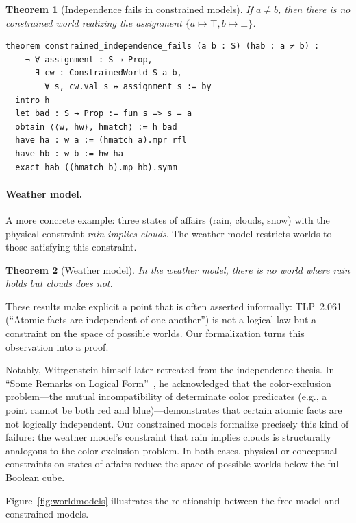 \documentclass[jsl,bibother]{asl}
\newtheorem{theorem}{Theorem}[section]
\theoremstyle{definition}
\theoremstyle{remark}
\begin{document}
\begin{theorem}[Independence fails in constrained models]
\label{thm:constrained}
If $a \neq b$, then there is no constrained world realizing the
assignment $\{a \mapsto \top, b \mapsto \bot\}$.
\end{theorem}

\begin{lstlisting}
theorem constrained_independence_fails (a b : S) (hab : a ≠ b) :
    ¬ ∀ assignment : S → Prop,
      ∃ cw : ConstrainedWorld S a b,
        ∀ s, cw.val s ↔ assignment s := by
  intro h
  let bad : S → Prop := fun s => s = a
  obtain ⟨⟨w, hw⟩, hmatch⟩ := h bad
  have ha : w a := (hmatch a).mpr rfl
  have hb : w b := hw ha
  exact hab ((hmatch b).mp hb).symm
\end{lstlisting}

\paragraph{Weather model.}
A more concrete example: three states of affairs (rain, clouds,
snow) with the physical constraint \emph{rain implies clouds}.
The weather model restricts worlds to those satisfying this
constraint.

\begin{theorem}[Weather model]
\label{thm:weather}
In the weather model, there is no world where rain holds but
clouds does not.
\end{theorem}

\noindent
These results make explicit a point that is often asserted
informally: TLP~2.061 (``Atomic facts are independent of one
another'') is not a logical law but a constraint on the space of
possible worlds.  Our formalization turns this observation into a
proof.

Notably, Wittgenstein himself later retreated from the
independence thesis.  In ``Some Remarks on Logical
Form''~\cite{wittgenstein1929}, he acknowledged that the
color-exclusion problem---the mutual incompatibility of
determinate color predicates (e.g., a point cannot be both red
and blue)---demonstrates that certain atomic facts are not
logically independent.  Our constrained models formalize
precisely this kind of failure: the weather model's constraint
that rain implies clouds is structurally analogous to the
color-exclusion problem.  In both cases, physical or conceptual
constraints on states of affairs reduce the space of possible
worlds below the full Boolean cube.

Figure~\ref{fig:worldmodels} illustrates the relationship
between the free model and constrained models.
\end{document}
